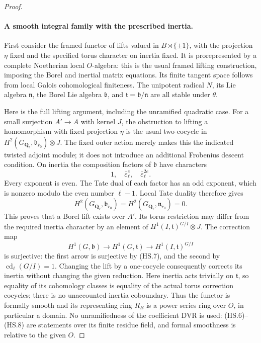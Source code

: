 \begin{proof}
\paragraph{A smooth integral family with the prescribed inertia.}
First consider the framed functor of lifts valued in
$B\rtimes\{\pm1\}$, with the projection $\eta$ fixed and the
specified torus character on inertia fixed.  It is prorepresented
by a complete Noetherian local $O$-algebra: this is the usual
framed lifting construction, imposing the Borel and inertial
matrix equations.  Its finite tangent space follows from local
Galois cohomological finiteness.  The unipotent radical $N$,
its Lie algebra $\mathfrak n$, the Borel Lie algebra
$\mathfrak b$, and $\mathfrak t=\mathfrak b/\mathfrak n$
are all stable under $\theta$.

Here is the full lifting argument, including the unramified
quadratic case.  For a small surjection $A'\to A$ with kernel
$J$, the obstruction to lifting a homomorphism with fixed
projection $\eta$ is the usual two-cocycle in
$H^2(G_{\mathbf Q_\ell},\mathfrak b_{\bar r_0})\otimes J$.
The fixed outer action merely makes this the indicated twisted
adjoint module; it does not introduce an additional Frobenius
descent condition.  On inertia the composition factors of
$\mathfrak b$ have characters
\[
                   1,\quad\bar\varepsilon_\ell^e,
                         \quad\bar\varepsilon_\ell^{2e}.
                                                               \tag{HS.6}
\]
Every exponent is even.  The Tate dual of each factor has an
odd exponent, which is nonzero modulo the even number
$\ell-1$.  Local Tate duality therefore gives
\[
 H^2(G_{\mathbf Q_\ell},\mathfrak b_{\bar r_0})
   =H^2(G_{\mathbf Q_\ell},\mathfrak n_{\bar r_0})=0.
                                                               \tag{HS.7}
\]
This proves that a Borel lift exists over $A'$.  Its torus
restriction may differ from the required inertia character by
an element of $H^1(I,\mathfrak t)^{G/I}\otimes J$.
The correction map
\[
 H^1(G,\mathfrak b)\longrightarrow
 H^1(G,\mathfrak t)\longrightarrow
 H^1(I,\mathfrak t)^{G/I}                                  \tag{HS.8}
\]
is surjective: the first arrow is surjective by (HS.7), and
the second by $\operatorname{cd}_\ell(G/I)=1$.
Changing the lift by a one-cocycle consequently corrects its
inertia without changing the given reduction.  Here inertia acts
trivially on $\mathfrak t$, so equality of its cohomology classes
is equality of the actual torus correction cocycles; there is
no unaccounted inertia coboundary.  Thus the functor
is formally smooth and its representing ring $R_B$ is a power
series ring over $O$, in particular a domain.  No unramifiedness
of the coefficient DVR is used: (HS.6)--(HS.8) are statements
over its finite residue field, and formal smoothness is relative
to the given $O$.


\end{proof}
